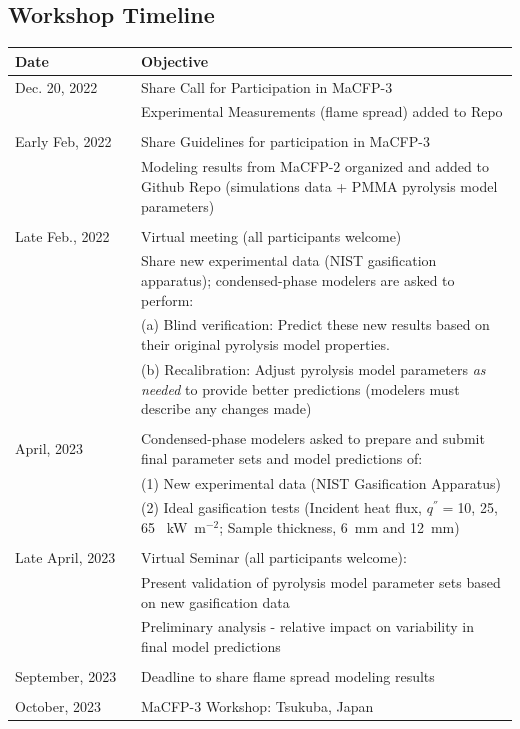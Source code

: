 \documentclass[12pt,demo]{article}
\begin{document}
\subsection{Workshop Timeline}
\label{Timeline}
\begin{table}[htb]
\begin{tabular}{p{0.25\linewidth} | p{0.75\linewidth}}
\hline
\textbf{Date}       	& \textbf{Objective} \\
\hline
Dec. 20, 2022	& Share Call for Participation in MaCFP-3\\
& Experimental Measurements (flame spread) added to Repo\\ 
\\
Early Feb, 2022    	& Share Guidelines for participation in MaCFP-3 \\
& Modeling results from MaCFP-2 organized and added to Github Repo (simulations data + PMMA pyrolysis model parameters)\\ 
\\
Late Feb., 2022  	& Virtual meeting (all participants welcome)\\
&Share new experimental data (NIST gasification apparatus); condensed-phase modelers are asked to perform:\\ 
&(a) Blind verification: Predict these new results based on their original pyrolysis model properties. \\ 
&(b) Recalibration: Adjust pyrolysis model parameters \textit{as needed} to provide better predictions (modelers must describe any changes made)\\ 
\\
April, 2023  &Condensed-phase modelers asked to prepare and submit final parameter sets and model predictions of: \\
&{ }(1) New experimental data (NIST Gasification Apparatus)\\    
&{ }(2) Ideal gasification tests (Incident heat flux, $q^{''}=$10, 25, 65 ~kW~m$^{-2}$; Sample thickness, 6~mm and 12~mm)\\
\\
Late April, 2023           	& Virtual Seminar (all participants welcome):\\ 
&Present validation of pyrolysis model parameter sets based on new gasification data \\ 
&Preliminary analysis - relative impact on variability in final model predictions\\
\\
September, 2023 	& Deadline to share flame spread modeling results \\ {}\\
October, 2023   	& MaCFP-3 Workshop: Tsukuba, Japan \\
\hline
\end{tabular}
\end{table}
\end{document}
